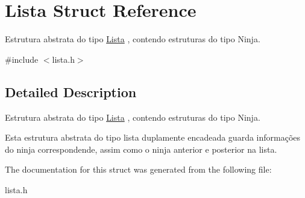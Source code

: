 \hypertarget{structLista}{}\section{Lista Struct Reference}
\label{structLista}


Estrutura abstrata do tipo \mbox{\hyperlink{structLista}{Lista}} , contendo estruturas do tipo Ninja.  




{\ttfamily \#include $<$lista.\+h$>$}



\subsection{Detailed Description}
Estrutura abstrata do tipo \mbox{\hyperlink{structLista}{Lista}} , contendo estruturas do tipo Ninja. 

Esta estrutura abstrata do tipo lista duplamente encadeada guarda informações do ninja correspondende, assim como o ninja anterior e posterior na lista. 

The documentation for this struct was generated from the following file\+:\begin{DoxyCompactItemize}
\item 
lista.\+h\end{DoxyCompactItemize}
